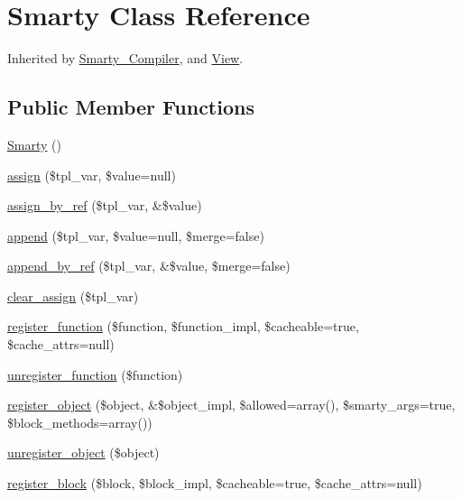 \hypertarget{class_smarty}{}\section{Smarty Class Reference}
\label{class_smarty}


Inherited by \mbox{\hyperlink{class_smarty___compiler}{Smarty\+\_\+\+Compiler}}, and \mbox{\hyperlink{class_view}{View}}.

\subsection*{Public Member Functions}
\begin{DoxyCompactItemize}
\item 
\mbox{\hyperlink{class_smarty_a3ebaf88e45f511385bad73cb83edf1c8}{Smarty}} ()
\item 
\mbox{\hyperlink{class_smarty_a63fc695d58eca87b622ba173849559a7}{assign}} (\$tpl\+\_\+var, \$value=null)
\item 
\mbox{\hyperlink{class_smarty_aa3f910aef32523bd7ed582ef6cab7ad0}{assign\+\_\+by\+\_\+ref}} (\$tpl\+\_\+var, \&\$value)
\item 
\mbox{\hyperlink{class_smarty_a9734b6bffb57d460a31e4c61ac2120cc}{append}} (\$tpl\+\_\+var, \$value=null, \$merge=false)
\item 
\mbox{\hyperlink{class_smarty_ae5977e32425f3fb958e10fc16c80ad25}{append\+\_\+by\+\_\+ref}} (\$tpl\+\_\+var, \&\$value, \$merge=false)
\item 
\mbox{\hyperlink{class_smarty_aaf28142ba020c1d0b84987280594bce7}{clear\+\_\+assign}} (\$tpl\+\_\+var)
\item 
\mbox{\hyperlink{class_smarty_a0c79d7ffdeb4f44ab8a2f80ea9f87d17}{register\+\_\+function}} (\$function, \$function\+\_\+impl, \$cacheable=true, \$cache\+\_\+attrs=null)
\item 
\mbox{\hyperlink{class_smarty_a391eb12cf1524df705a3005413ce2265}{unregister\+\_\+function}} (\$function)
\item 
\mbox{\hyperlink{class_smarty_a0edb4ce246f106dc31d2e2ac7f4242e3}{register\+\_\+object}} (\$object, \&\$object\+\_\+impl, \$allowed=array(), \$smarty\+\_\+args=true, \$block\+\_\+methods=array())
\item 
\mbox{\hyperlink{class_smarty_aeed6d4f5f6955a815fff6d6eab99f856}{unregister\+\_\+object}} (\$object)
\item 
\mbox{\hyperlink{class_smarty_ac827010347b70c7ab693b706b4ac4721}{register\+\_\+block}} (\$block, \$block\+\_\+impl, \$cacheable=true, \$cache\+\_\+attrs=null)

\end{DoxyCompactItemize}
